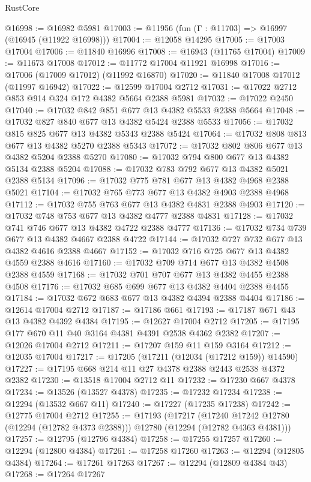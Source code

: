\begin{lexlean}{RustCore}
\begin{coremodule}
@16998 := @16982 @5981
@17003 := @11956 (fun (Γ : @11703) => @16997 (@16945 (@11922 @16998)))
@17004 := @12058 @14295
@17005 := @17003 @17004
@17006 := @11840 @16996
@17008 := @16943 (@11765 @17004)
@17009 := @11673 @17008
@17012 := @11772 @17004 @11921 @16998
@17016 := @17006 (@17009 @17012) (@11992 @16870)
@17020 := @11840 @17008 @17012 (@11997 @16942)
@17022 := @12599 @17004 @2712
@17031 := @17022 @2712 @853 @914 @324 @172 @4382 @5664 @2388 @5981
@17032 := @17022 @2450
@17040 := @17032 @842 @851 @677 @13 @4382 @5533 @2388 @5664
@17048 := @17032 @827 @840 @677 @13 @4382 @5424 @2388 @5533
@17056 := @17032 @815 @825 @677 @13 @4382 @5343 @2388 @5424
@17064 := @17032 @808 @813 @677 @13 @4382 @5270 @2388 @5343
@17072 := @17032 @802 @806 @677 @13 @4382 @5204 @2388 @5270
@17080 := @17032 @794 @800 @677 @13 @4382 @5134 @2388 @5204
@17088 := @17032 @783 @792 @677 @13 @4382 @5021 @2388 @5134
@17096 := @17032 @775 @781 @677 @13 @4382 @4968 @2388 @5021
@17104 := @17032 @765 @773 @677 @13 @4382 @4903 @2388 @4968
@17112 := @17032 @755 @763 @677 @13 @4382 @4831 @2388 @4903
@17120 := @17032 @748 @753 @677 @13 @4382 @4777 @2388 @4831
@17128 := @17032 @741 @746 @677 @13 @4382 @4722 @2388 @4777
@17136 := @17032 @734 @739 @677 @13 @4382 @4667 @2388 @4722
@17144 := @17032 @727 @732 @677 @13 @4382 @4616 @2388 @4667
@17152 := @17032 @716 @725 @677 @13 @4382 @4559 @2388 @4616
@17160 := @17032 @709 @714 @677 @13 @4382 @4508 @2388 @4559
@17168 := @17032 @701 @707 @677 @13 @4382 @4455 @2388 @4508
@17176 := @17032 @685 @699 @677 @13 @4382 @4404 @2388 @4455
@17184 := @17032 @672 @683 @677 @13 @4382 @4394 @2388 @4404
@17186 := @12614 @17004 @2712
@17187 := @17186 @661
@17193 := @17187 @671 @43 @13 @4382 @4392 @4384
@17195 := @12627 @17004 @2712
@17205 := @17195 @177 @670 @11 @40 @3164 @4381 @4391 @2538 @4362 @2382
@17207 := @12026 @17004 @2712
@17211 := @17207 @159 @11 @159 @3164
@17212 := @12035 @17004
@17217 := @17205 (@17211 (@12034 (@17212 @159)) @14590)
@17227 := @17195 @668 @214 @11 @27 @4378 @2388 @2443 @2538 @4372 @2382
@17230 := @13518 @17004 @2712 @11
@17232 := @17230 @667 @4378
@17234 := @13526 (@13527 @4378)
@17235 := @17232 @17234
@17238 := @12294 (@13532 @667 @11)
@17240 := @17227 (@17235 @17238)
@17242 := @12775 @17004 @2712
@17255 := @17193
    (@17217
      (@17240 @17242 @12780 (@12294 (@12782 @4373 @2388)))
      @12780
      (@12294 (@12782 @4363 @4381)))
@17257 := @12795 (@12796 @4384)
@17258 := @17255 @17257
@17260 := @12294 (@12800 @4384)
@17261 := @17258 @17260
@17263 := @12294 (@12805 @4384)
@17264 := @17261 @17263
@17267 := @12294 (@12809 @4384 @43)
@17268 := @17264 @17267

\end{coremodule}
\end{lexlean}
